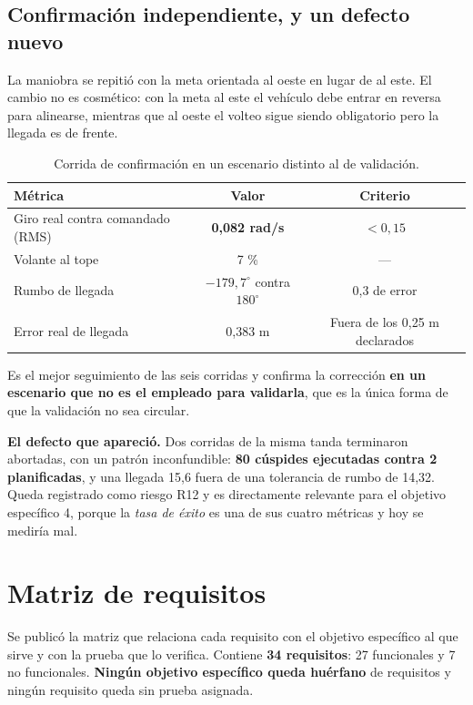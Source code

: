 \documentclass[12pt,letterpaper]{article}
\begin{document}
\subsection{Confirmación independiente, y un defecto nuevo}

La maniobra se repitió con la meta orientada al oeste en lugar de al este. El cambio no es cosmético: con la meta al este el vehículo debe entrar en reversa para alinearse, mientras que al oeste el volteo sigue siendo obligatorio pero la llegada es de frente.

\begin{table}[H]
    \centering
    \small
    \caption{Corrida de confirmación en un escenario distinto al de validación.}
    \label{tab:confirmacion}
    \begin{tabular}{@{}lcc@{}}
        \toprule
        \textbf{Métrica} & \textbf{Valor} & \textbf{Criterio} \\ \midrule
        Giro real contra comandado (RMS) & \textbf{0,082 rad/s} & $< 0{,}15$ \\
        Volante al tope & 7 \% & --- \\
        Rumbo de llegada & $-179{,}7^\circ$ contra $180^\circ$ & 0,3\textdegree{} de error \\
        Error real de llegada & 0,383 m & Fuera de los 0,25 m declarados \\ \bottomrule
    \end{tabular}
\end{table}

Es el mejor seguimiento de las seis corridas y confirma la corrección \textbf{en un escenario que no es el empleado para validarla}, que es la única forma de que la validación no sea circular.

\textbf{El defecto que apareció.} Dos corridas de la misma tanda terminaron abortadas, con un patrón inconfundible: \textbf{80 cúspides ejecutadas contra 2 planificadas}, y una llegada 15,6\textdegree{} fuera de una tolerancia de rumbo de 14,32\textdegree. Queda registrado como riesgo R12 y es directamente relevante para el objetivo específico 4, porque la \emph{tasa de éxito} es una de sus cuatro métricas y hoy se mediría mal.

\section{Matriz de requisitos}
\label{sec:requisitos}

Se publicó la matriz que relaciona cada requisito con el objetivo específico al que sirve y con la prueba que lo verifica. Contiene \textbf{34 requisitos}: 27 funcionales y 7 no funcionales. \textbf{Ningún objetivo específico queda huérfano} de requisitos y ningún requisito queda sin prueba asignada.
\end{document}
